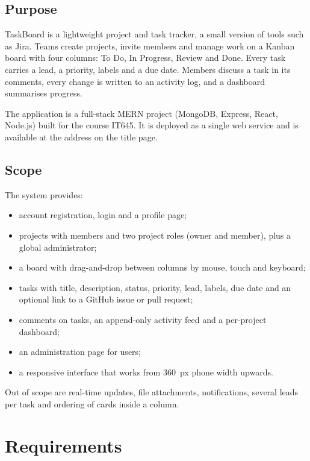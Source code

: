 \documentclass[11pt,a4paper]{article}
\begin{document}
\subsection{Purpose}
TaskBoard is a lightweight project and task tracker, a small version of tools such as Jira. Teams create projects, invite members and manage work on a Kanban board with four columns: To Do, In Progress, Review and Done. Every task carries a lead, a priority, labels and a due date. Members discuss a task in its comments, every change is written to an activity log, and a dashboard summarises progress.

The application is a full-stack MERN project (MongoDB, Express, React, Node.js) built for the course IT645. It is deployed as a single web service and is available at the address on the title page.

\subsection{Scope}
The system provides:
\begin{itemize}
  \item account registration, login and a profile page;
  \item projects with members and two project roles (owner and member), plus a global administrator;
  \item a board with drag-and-drop between columns by mouse, touch and keyboard;
  \item tasks with title, description, status, priority, lead, labels, due date and an optional link to a GitHub issue or pull request;
  \item comments on tasks, an append-only activity feed and a per-project dashboard;
  \item an administration page for users;
  \item a responsive interface that works from 360~px phone width upwards.
\end{itemize}
Out of scope are real-time updates, file attachments, notifications, several leads per task and ordering of cards inside a column.

\section{Requirements}
\end{document}
